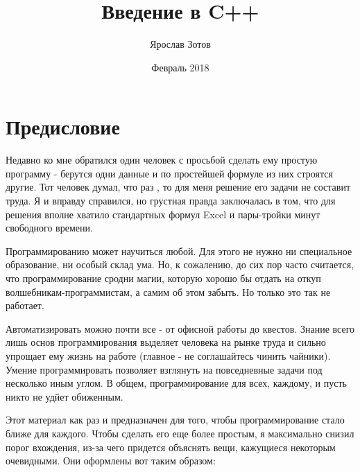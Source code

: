 \documentclass{article}
\begin{document}
\fontsize{14}{16pt}\selectfont  %
\title{Введение в C++}
\author{Ярослав Зотов}
\date{Февраль 2018}

\newcommand{\fordummies}[1]{
\begin{snugshade*}
#1
\end{snugshade*}
} %


\section{Предисловие}

Недавно ко мне обратился один человек с просьбой сделать ему простую программу - берутся одни данные и по простейшей формуле из них строятся другие. Тот человек думал, что раз \grqq, то для меня решение его задачи не составит труда. Я и вправду справился, но грустная правда  заключалась в том, что для решения вполне хватило стандартных формул Excel и пары-тройки минут свободного времени.

Программированию может научиться любой. Для этого не нужно ни специальное образование, ни особый склад ума. Но, к сожалению, до сих пор часто считается, что программирование сродни магии, которую хорошо бы отдать на откуп волшебникам-программистам, а самим об этом забыть. Но только это так не работает. 

Автоматизировать можно почти все - от офисной работы до квестов. Знание всего лишь основ программирования выделяет человека на рынке труда и сильно упрощает ему жизнь на работе (главное - не соглашайтесь чинить чайники). Умение программировать позволяет взглянуть на повседневные задачи под несколько иным углом. В общем, программирование для всех, каждому, и пусть никто не удйет обиженным.

Этот материал как раз и предназначен для того, чтобы программирование стало ближе для каждого. Чтобы сделать его еще более простым, я максимально снизил порог вхождения, из-за чего придется объяснять вещи, кажущиеся некоторым очевидными. Они оформлены вот таким образом:
\end{document}
